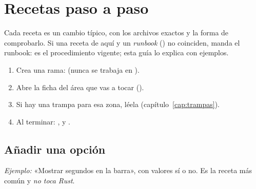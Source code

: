 \chapter{Recetas paso a paso}
\label{cap:recetas}

Cada receta es un cambio típico, con los archivos exactos y la forma de comprobarlo. Si una
receta de aquí y un \emph{runbook} () no coinciden, manda el runbook:
es el procedimiento vigente; esta guía lo explica con ejemplos.

\begin{idea}
\begin{enumerate}
  \item Crea una rama:  (nunca se trabaja en ).
  \item Abre la ficha del área que vas a tocar ().
  \item Si hay una trampa para esa zona, léela (capítulo~\ref{cap:trampas}).
  \item Al terminar: ,  y
  .
\end{enumerate}
\end{idea}

\section{Añadir una opción}

\emph{Ejemplo:} «Mostrar segundos en la barra», con valores sí o no. Es la receta más común y
\emph{no toca Rust}.

